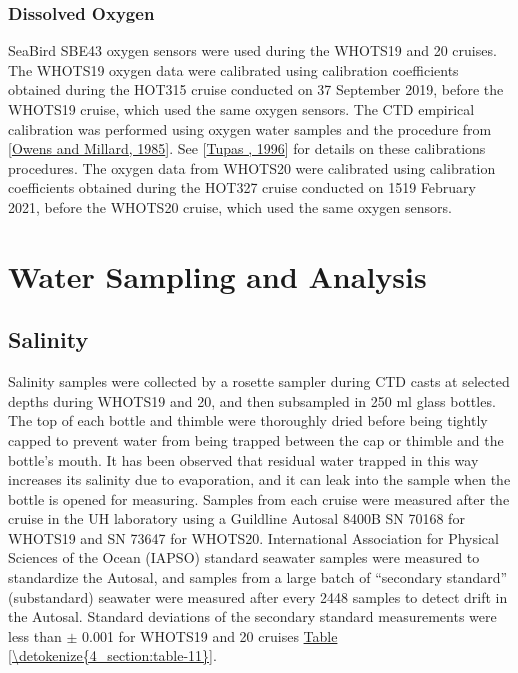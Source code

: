 \documentclass[a4paper,10pt,english,openany,oneside]{sphinxmanual}
\begin{document}
\subsubsection{Dissolved Oxygen}
\label{\detokenize{4_section:dissolved-oxygen}}
\sphinxAtStartPar
Sea\sphinxhyphen{}Bird SBE\sphinxhyphen{}43 oxygen sensors were used during the WHOTS\sphinxhyphen{}19 and \sphinxhyphen{}20 cruises.
The WHOTS\sphinxhyphen{}19 oxygen data were calibrated using calibration coefficients
obtained during the HOT\sphinxhyphen{}315 cruise conducted on 3\sphinxhyphen{}7 September 2019, before the
WHOTS\sphinxhyphen{}19 cruise, which used the same oxygen sensors. The CTD empirical
calibration was performed using oxygen water samples and the procedure from
{[}\hyperlink{cite.references:id13}{Owens and Millard, 1985}{]}. See {[}\hyperlink{cite.references:id19}{Tupas , 1996}{]} for details on these calibrations
procedures. The oxygen data from WHOTS\sphinxhyphen{}20 were calibrated using calibration
coefficients obtained during the HOT\sphinxhyphen{}327 cruise conducted on 15\sphinxhyphen{}19 February
2021, before the WHOTS\sphinxhyphen{}20 cruise, which used the same oxygen sensors.


\section{Water Sampling and Analysis}
\label{\detokenize{4_section:water-sampling-and-analysis}}

\subsection{Salinity}
\label{\detokenize{4_section:salinity}}
\sphinxAtStartPar
Salinity samples were collected by a rosette sampler during CTD casts at
selected depths during WHOTS\sphinxhyphen{}19 and \sphinxhyphen{}20, and then sub\sphinxhyphen{}sampled in 250 ml glass
bottles. The top of each bottle and thimble were thoroughly dried before being
tightly capped to prevent water from being trapped between the cap or thimble
and the bottle’s mouth. It has been observed that residual water trapped in
this way increases its salinity due to evaporation, and it can leak into the
sample when the bottle is opened for measuring. Samples from each cruise were
measured after the cruise in the UH laboratory using a Guildline Autosal 8400B
SN 70168 for WHOTS\sphinxhyphen{}19 and SN 73647 for WHOTS\sphinxhyphen{}20. International Association for
Physical Sciences of the Ocean (IAPSO) standard seawater samples were measured
to standardize the Autosal, and samples from a large batch of “secondary
standard” (substandard) seawater were measured after every 24\sphinxhyphen{}48 samples to
detect drift in the Autosal. Standard deviations of the secondary standard
measurements were less than \(\pm\) 0.001 for WHOTS\sphinxhyphen{}19 and \sphinxhyphen{}20 cruises
\hyperref[\detokenize{4_section:table-11}]{Table \ref{\detokenize{4_section:table-11}}}.
\end{document}
